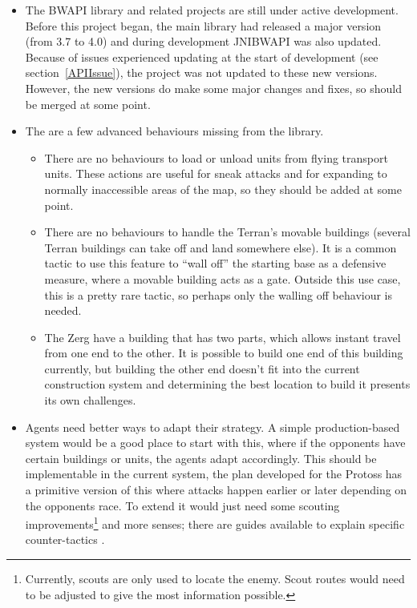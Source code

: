 \documentclass[11pt,openright,a4paper]{report}
\begin{document}
\begin{itemize}
\item{The BWAPI library and related projects are still under active development. Before this project began, the main library had released a major version (from 3.7 to 4.0) and during development JNIBWAPI was also updated. Because of issues experienced updating at the start of development (see section~\ref{APIIssue}), the project was not updated to these new versions. However, the new versions do make some major changes and fixes, so should be merged at some point.}
\item{The are a few advanced behaviours missing from the library.
    \begin{itemize}
        \item{There are no behaviours to load or unload units from flying transport units. These actions are useful for sneak attacks and for expanding to normally inaccessible areas of the map, so they should be added at some point.}
        \item{There are no behaviours to handle the Terran's movable buildings (several Terran buildings can take off and land somewhere else). It is a common tactic to use this feature to ``wall off'' the starting base as a defensive measure, where a movable building acts as a gate. Outside this use case, this is a pretty rare tactic, so perhaps only the walling off behaviour is needed.}
        \item{The Zerg have a building that has two parts, which allows instant travel from one end to the other. It is possible to build one end of this building currently, but building the other end doesn't fit into the current construction system and determining the best location to build it presents its own challenges.}
    \end{itemize}}
\item{Agents need better ways to adapt their strategy. A simple production-based system would be a good place to start with this, where if the opponents have certain buildings or units, the agents adapt accordingly. This should be implementable in the current system, the plan developed for the Protoss has a primitive version of this where attacks happen earlier or later depending on the opponents race. To extend it would just need some scouting improvements\footnote{Currently, scouts are only used to locate the enemy. Scout routes would need to be adjusted to give the most information possible.} and more senses; there are guides available to explain specific counter-tactics \cite{StratWiki}.}

\end{itemize}
\end{document}

